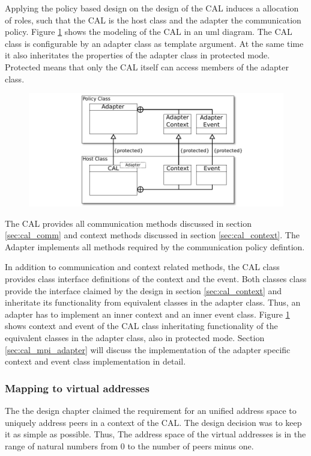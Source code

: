 Applying the policy based design on the design of the CAL
induces a allocation of roles, such that the CAL is the host class and
the adapter the communication policy. Figure \ref{fig:cal_uml} shows
the modeling of the CAL in an uml diagram. The CAL class is configurable by
an adapter class as template argument. At the same time it also inheritates
the properties of the adapter class in protected mode. Protected means
that only the CAL itself can access members of the adapter class.

\begin{figure}[H]
  \centering \includegraphics[width=\textwidth]{graphics/40_cal_uml}
  \caption{ }
  \label{fig:cal_uml}
\end{figure}

The CAL provides all communication methods discussed in section
\ref{sec:cal_comm} and context methods discussed in section
\ref{sec:cal_context}. The Adapter implements all methods
required by the communication policy defintion.


In addition to communication and context related methods, the CAL
class provides class interface definitions of the context and the
event. Both classes class provide the interface claimed by the design
in section \ref{sec:cal_context} and inheritate its functionality from
equivalent classes in the adapter class. Thus, an adapter has to
implement an inner context and an inner event class.  Figure
\ref{fig:cal_uml} shows context and event of the CAL class
inheritating functionality of the equivalent classes in the adapter
class, also in protected mode. Section
\ref{sec:cal_mpi_adapter} will discuss the implementation of the adapter
specific context and event class implementation in detail.

\subsubsection{Mapping to virtual addresses}
The the design chapter claimed the requirement for an unified address
space to uniquely address peers in a context of the CAL. The design decision
was to keep it as simple as possible. Thus, The address space of the
virtual addresses is in the range of natural numbers from 0 to the number
of peers minus one.

